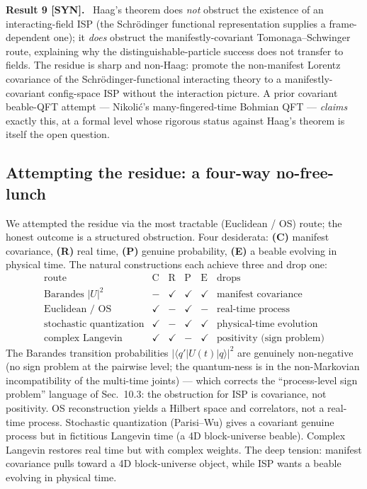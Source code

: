 \documentclass[aps,prd,preprint,amsmath,amssymb,nofootinbib,superscriptaddress]{revtex4-2}
\newenvironment{result}[1]{\par\medskip\noindent\textbf{#1}\ }{\par\medskip}
\begin{document}
\begin{result}{Result 9 [SYN].}
Haag's theorem does \emph{not} obstruct the existence of an interacting-field ISP (the
Schr\"odinger functional representation \cite{Symanzik1981} supplies a frame-dependent one);
it \emph{does} obstruct the manifestly-covariant Tomonaga--Schwinger route, explaining why the
distinguishable-particle success \cite{Tumulka2020} does not transfer to fields. The residue
is sharp and non-Haag: promote the non-manifest Lorentz covariance of the Schr\"odinger-functional
interacting theory to a manifestly-covariant config-space ISP without the interaction picture.
A prior covariant beable-QFT attempt --- Nikoli\'c's many-fingered-time Bohmian QFT
\cite{Nikolic2006} --- \emph{claims} exactly this, at a formal level whose rigorous status
against Haag's theorem is itself the open question.
\end{result}

\subsection{Attempting the residue: a four-way no-free-lunch}
\label{sec:nofreelunch}
We attempted the residue via the most tractable (Euclidean / OS) route; the honest outcome is a
structured obstruction. Four desiderata: \textbf{(C)} manifest covariance, \textbf{(R)} real
time, \textbf{(P)} genuine probability, \textbf{(E)} a beable evolving in physical time. The
natural constructions each achieve three and drop one:
\begin{equation}
\boxed{\;
\begin{array}{l|cccc|l}
\text{route} & \text{C} & \text{R} & \text{P} & \text{E} & \text{drops}\\
\hline
\text{Barandes }|U|^2 & - & \checkmark & \checkmark & \checkmark & \text{manifest covariance}\\
\text{Euclidean / OS} & \checkmark & - & \checkmark & - & \text{real-time process}\\
\text{stochastic quantization} & \checkmark & - & \checkmark & \checkmark & \text{physical-time evolution}\\
\text{complex Langevin} & \checkmark & \checkmark & - & \checkmark & \text{positivity (sign problem)}
\end{array}\;}
\end{equation}
The Barandes transition probabilities $|\langle q'|U(t)|q\rangle|^2$ are genuinely non-negative
(no sign problem at the pairwise level; the quantum-ness is in the non-Markovian incompatibility
of the multi-time joints) --- which corrects the ``process-level sign problem'' language of
Sec.~10.3: the obstruction for ISP is covariance, not positivity. OS reconstruction yields a
Hilbert space and correlators, not a real-time process. Stochastic quantization (Parisi--Wu)
gives a covariant genuine process but in fictitious Langevin time (a 4D block-universe beable).
Complex Langevin restores real time but with complex weights. The deep tension: manifest
covariance pulls toward a 4D block-universe object, while ISP wants a beable evolving in
physical time.
\end{document}
